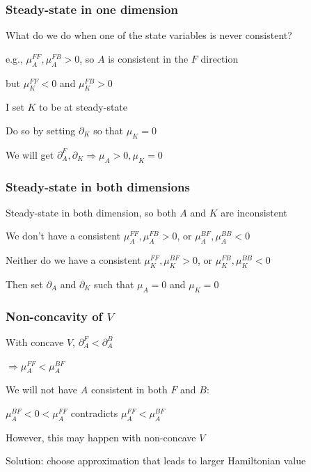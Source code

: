 \documentclass[aspectratio=169]{beamer}
\newenvironment{wideitemize}{\itemize\addtolength{\itemsep}{10pt}}{\enditemize}
\begin{document}
\begin{frame}
    \frametitle{Steady-state in one dimension}

    \begin{wideitemize}
        \item What do we do when one of the state variables is never consistent?
        \item e.g., $\mu_A^{FF}, \mu_A^{FB} > 0$, so $A$ is consistent in the $F$ direction
        \item but $\mu_K^{FF} < 0$ and $\mu_K^{FB} > 0$
        \item I set $K$ to be at steady-state
        \item Do so by setting $\partial_K$ so that $\mu_K = 0$
        \item We will get $\partial_A^F, \partial_K \Rightarrow \mu_A > 0, \mu_K = 0$
    \end{wideitemize}

\end{frame}

\begin{frame}
    \frametitle{Steady-state in both dimensions}

    \begin{wideitemize}
        \item Steady-state in both dimension, so both $A$ and $K$ are inconsistent
        \item We don't have a consistent $\mu_A^{FF}, \mu_A^{FB} > 0$, or $\mu_A^{BF}, \mu_A^{BB} < 0$
        \item Neither do we have a consistent $\mu_K^{FF}, \mu_K^{BF} > 0$, or $\mu_K^{FB}, \mu_K^{BB} < 0$
        \item Then set $\partial_A$ and $\partial_K$ such that $\mu_A = 0$ and $\mu_K = 0$
    \end{wideitemize}

\end{frame}


\begin{frame}
    \frametitle{Non-concavity of $V$}

    \begin{wideitemize}
        \item With concave $V$, $\partial_A^F < \partial_A^B$
        \item $\Rightarrow \mu_A^{FF} < \mu_A^{BF}$
        \item We will not have $A$ consistent in both $F$ and $B$:
        \begin{wideitemize}
            \item $\mu_A^{BF} < 0 <\mu_A^{FF}$ contradicts $\mu_A^{FF} < \mu_A^{BF}$
        \end{wideitemize}
        \item However, this may happen with non-concave $V$
        \item Solution: choose approximation that leads to larger Hamiltonian value
    \end{wideitemize}

\end{frame}
\end{document}
